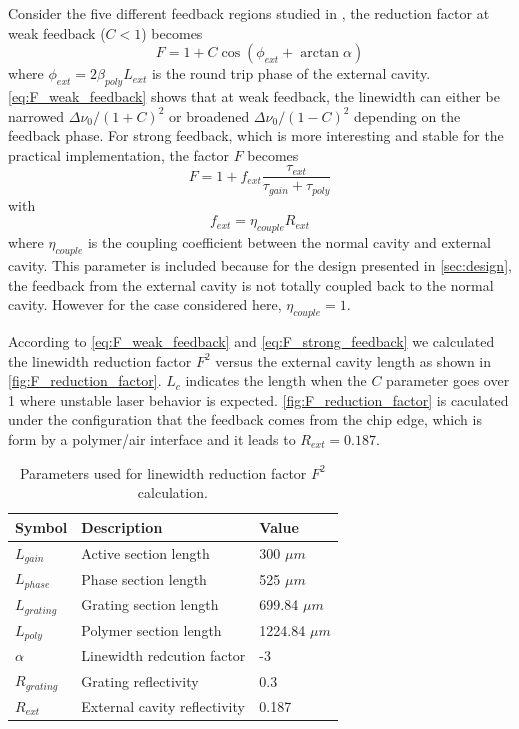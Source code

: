 Consider the five different feedback regions studied in \cite{tkach1986regimes}, the reduction factor at weak feedback ($C<1$) becomes \cite{coldren2012diode, petermann2012laser}
\begin{equation}
    F=1+C\cos(\phi_{ext}+\arctan\alpha)
    \label{eq:F_weak_feedback}
\end{equation}
where $\phi_{ext}=2\beta_{poly}L_{ext}$ is the round trip phase of the external cavity. \autoref{eq:F_weak_feedback} shows that at weak feedback, the linewidth can either be narrowed $\Delta\nu_0/(1+C)^2$ or broadened $\Delta\nu_0/(1-C)^2$ depending on the feedback phase. For strong feedback, which is more interesting and stable for the practical implementation, the factor $F$ becomes
\begin{equation}
    F=1+f_{ext}\frac{\tau_{ext}}{\tau_{gain}+\tau_{poly}}
    \label{eq:F_strong_feedback}
\end{equation}
with
\begin{equation}
    f_{ext}=\eta_{couple}R_{ext}
    \label{eq:F_f_ext}
\end{equation}
where $\eta_{couple}$ is the coupling coefficient between the normal cavity and external cavity. This parameter is included because for the design presented in \autoref{sec:design}, the feedback from the external cavity is not totally coupled back to the normal cavity. However for the case considered here, $\eta_{couple}=1$.

According to \autoref{eq:F_weak_feedback} and \autoref{eq:F_strong_feedback} we calculated the linewidth reduction factor $F^2$ versus the external cavity length as shown in \autoref{fig:F_reduction_factor}. $L_c$ indicates the length when the $C$ parameter goes over 1 where unstable laser behavior is expected. \autoref{fig:F_reduction_factor} is caculated under the configuration that the feedback comes from the chip edge, which is form by a polymer/air interface and it leads to $R_{ext}=0.187$.

\begin{table}[ht]
    \centering
    \caption{Parameters used for linewidth reduction factor $F^2$ calculation.}
    \begin{tabular}{@{}lll@{}}
    \toprule
    Symbol        & Description                  & Value           \\ \midrule
    $L_{gain}$    & Active section length        & 300 $\mu m$     \\
    $L_{phase}$   & Phase section length         & 525 $\mu m$     \\
    $L_{grating}$ & Grating section length       & 699.84 $\mu m$  \\
    $L_{poly}$    & Polymer section length       & 1224.84 $\mu m$ \\
    $\alpha$      & Linewidth redcution factor   & -3              \\
    $R_{grating}$ & Grating reflectivity         & 0.3             \\
    $R_{ext}$     & External cavity reflectivity & 0.187           \\ \bottomrule
    \end{tabular}
    \label{tab:F_reduction_factor}
\end{table}

